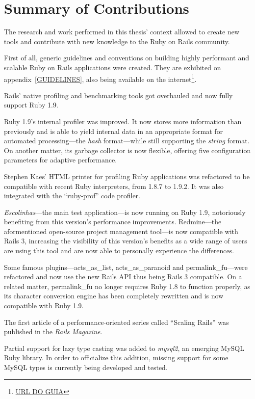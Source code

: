\section{Summary of Contributions}
The research and work performed in this thesis' context allowed to create new tools and contribute with new knowledge to the Ruby on Rails community.

First of all, generic guidelines and conventions on building highly performant and scalable Ruby on Rails applications were created. They are exhibited on appendix~\ref{GUIDELINES}, also being available on the internet\footnote{\url{URL DO GUIA}}.

Rails' native profiling and benchmarking tools got overhauled and now fully support Ruby 1.9.

Ruby 1.9's internal profiler was improved. It now stores more information than previously and is able to yield internal data in an appropriate format for automated processing---the \textit{hash} format---while still supporting the \textit{string} format. On another matter, its garbage collector is now flexible, offering five configuration parameters for adaptive performance.

Stephen Kaes' HTML printer for profiling Ruby applications was refactored to be compatible with recent Ruby interpreters, from 1.8.7 to 1.9.2. It was also integrated with the ``ruby-prof'' code profiler.

\textit{Escolinhas}---the main test application---is now running on Ruby 1.9, notoriously benefiting from this version's performance improvements. Redmine---the aformentioned open-source project management tool---is now compatible with Rails 3, increasing the visibility of this version's benefits as a wide range of users are using this tool and are now able to personally experience the differences.

Some famous plugins---acts\_as\_list, acts\_as\_paranoid and permalink\_fu---were refactored and now use the new Rails API thus being Rails 3 compatible. On a related matter, permalink\_fu no longer requires Ruby 1.8 to function properly, as its character conversion engine has been completely rewritten and is now compatible with Ruby 1.9.

The first article of a performance-oriented series called ``Scaling Rails'' was published in the \textit{Rails Magazine}.

Partial support for lazy type casting was added to \textit{mysql2}, an emerging MySQL Ruby library. In order to officialize this addition, missing support for some MySQL types is currently being developed and tested.

